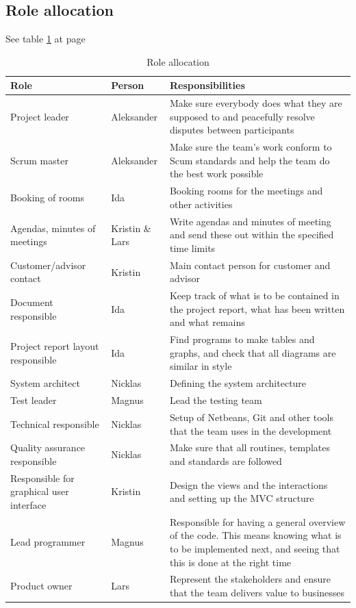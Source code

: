 \subsection{Role allocation}
See table \ref{tab:roleallocation} at page \pageref{tab:roleallocation}
\begin{table}
\begin{tabularx}{\linewidth}{>{\setlength\hsize{.5\hsize}}X|>{\setlength\hsize{0.3\hsize}}X|>{\setlength\hsize{1\hsize}}X}
\textbf{Role} & \textbf{Person} & \textbf{Responsibilities} \\ \hline \hline
Project leader & Aleksander & Make sure everybody does what they are supposed to and peacefully resolve disputes between participants \\ \hline
Scrum master & Aleksander & Make sure the team’s work conform to Scum standards and help the team do the best work possible \\ \hline
Booking of rooms & Ida & Booking rooms for the meetings and other activities \\ \hline
Agendas, minutes of meetings & Kristin \& Lars &Write agendas and minutes of meeting and send these out within the specified time limits \\ \hline
Customer/advisor contact & Kristin & Main contact person for customer and advisor \\ \hline
Document responsible & Ida &Keep track of what is to be contained in the project report, what has been written and what remains \\ \hline
Project report layout responsible & Ida &Find programs to make tables and graphs, and check that all diagrams are similar in style \\ \hline
System architect & Nicklas & Defining the system architecture \\ \hline
Test leader & Magnus & Lead the testing team \\ \hline
Technical responsible & Nicklas & Setup of Netbeans, Git and other tools that the team uses in the development \\ \hline
Quality assurance responsible & Nicklas & Make sure that all routines, templates and standards are followed \\ \hline
Responsible for graphical user interface & Kristin & Design the views and the interactions and setting up the MVC structure \\ \hline
Lead programmer & Magnus & Responsible for having a general overview of the code. This means knowing what is to be implemented next, and seeing that this is done at the right time \\ \hline
Product owner & Lars & Represent the stakeholders and ensure that the team delivers value to businesses
\end{tabularx}
\caption {Role allocation} \label{tab:roleallocation}
\end{table}

